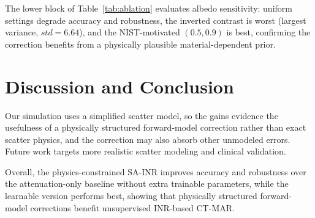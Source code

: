 \documentclass[journal]{IEEEtran}
\begin{document}
The lower block of Table~\ref{tab:ablation} evaluates albedo sensitivity: uniform settings degrade accuracy and robustness, the inverted contrast is worst (largest variance, $std{=}6.64$), and the NIST-motivated $(0.5,0.9)$ is best, confirming the correction benefits from a physically plausible material-dependent prior.

\section{Discussion and Conclusion}

Our simulation uses a simplified scatter model, so the gains evidence the usefulness of a physically structured forward-model correction rather than exact scatter physics, and the correction may also absorb other unmodeled errors. Future work targets more realistic scatter modeling and clinical validation.


Overall, the physics-constrained SA-INR improves accuracy and robustness over the attenuation-only baseline without extra trainable parameters, while the learnable version performs best, showing that physically structured forward-model corrections benefit unsupervised INR-based CT-MAR.




\end{document}

